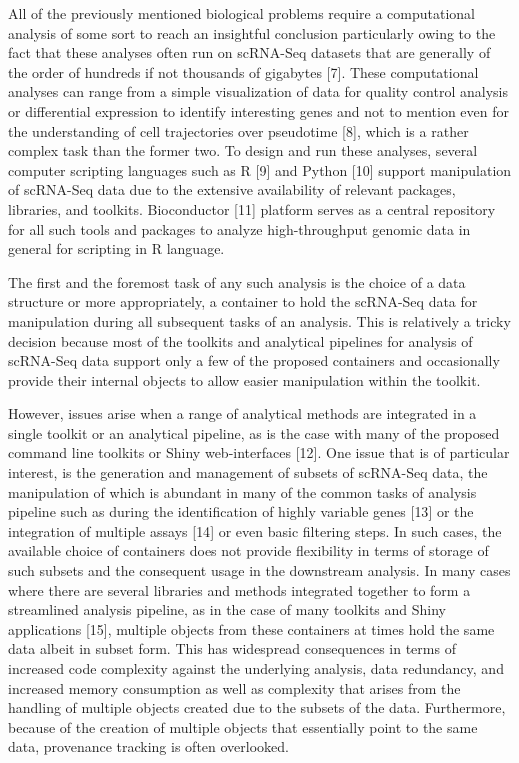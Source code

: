 \documentclass[
]{article}
\begin{document}
All of the previously mentioned biological problems require a
computational analysis of some sort to reach an insightful conclusion
particularly owing to the fact that these analyses often run on
scRNA-Seq datasets that are generally of the order of hundreds if not
thousands of gigabytes {[}7{]}. These computational analyses can range
from a simple visualization of data for quality control analysis or
differential expression to identify interesting genes and not to mention
even for the understanding of cell trajectories over pseudotime {[}8{]},
which is a rather complex task than the former two. To design and run
these analyses, several computer scripting languages such as R {[}9{]}
and Python {[}10{]} support manipulation of scRNA-Seq data due to the
extensive availability of relevant packages, libraries, and toolkits.
Bioconductor {[}11{]} platform serves as a central repository for all
such tools and packages to analyze high-throughput genomic data in
general for scripting in R language.

The first and the foremost task of any such analysis is the choice of a
data structure or more appropriately, a container to hold the scRNA-Seq
data for manipulation during all subsequent tasks of an analysis. This
is relatively a tricky decision because most of the toolkits and
analytical pipelines for analysis of scRNA-Seq data support only a few
of the proposed containers and occasionally provide their internal
objects to allow easier manipulation within the toolkit.

However, issues arise when a range of analytical methods are integrated
in a single toolkit or an analytical pipeline, as is the case with many
of the proposed command line toolkits or Shiny web-interfaces {[}12{]}.
One issue that is of particular interest, is the generation and
management of subsets of scRNA-Seq data, the manipulation of which is
abundant in many of the common tasks of analysis pipeline such as during
the identification of highly variable genes {[}13{]} or the integration
of multiple assays {[}14{]} or even basic filtering steps. In such
cases, the available choice of containers does not provide flexibility
in terms of storage of such subsets and the consequent usage in the
downstream analysis. In many cases where there are several libraries and
methods integrated together to form a streamlined analysis pipeline, as
in the case of many toolkits and Shiny applications {[}15{]}, multiple
objects from these containers at times hold the same data albeit in
subset form. This has widespread consequences in terms of increased code
complexity against the underlying analysis, data redundancy, and
increased memory consumption as well as complexity that arises from the
handling of multiple objects created due to the subsets of the data.
Furthermore, because of the creation of multiple objects that
essentially point to the same data, provenance tracking is often
overlooked.
\end{document}
